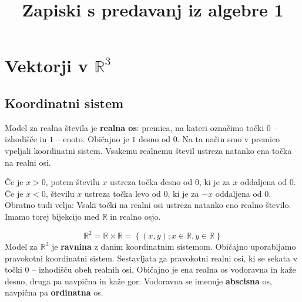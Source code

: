 \documentclass[a4,12pt]{article}
\title{Zapiski s predavanj iz algebre 1}
\newcommand{\R}{\mathbb{R}}
\begin{document}
\maketitle

\tableofcontents

\section{Vektorji v \(\R^3\)}
\subsection{Koordinatni sistem}
    Model za realna števila je \textbf{realna os}: premica, na kateri označimo točki \(0\) -- izhodišče in \(1\) -- enoto.
    Običajno je \(1\) desno od \(0\). Na ta način smo v premico vpeljali koordinatni sistem. Vsakemu realnemu števil
    ustreza natanko ena točka na realni osi.

    Če je \(x > 0\), potem številu \(x\) ustreza točka desno od \(0\), ki je za \(x\) oddaljena od \(0\). Če je 
    \(x < 0\), številu \(x\) ustreza točka levo od \(0\), ki je za \(-x\) oddaljena od \(0\).
    Obratno tudi velja: Vsaki točki na realni osi ustreza natanko eno realno število.
    Imamo torej bijekcijo med \(\R\) in realno osjo.

    \[\R^2 = \R \times \R = \left\{\left(x, y\right); x \in \R, y \in \R\right\}\]
    Model za \(\R^2\) je \textbf{ravnina} z danim koordinatnim sistemom. Običajno uporabljamo pravokotni koordinatni sistem.
    Sestavljata ga pravokotni realni osi, ki se sekata v točki \(0\) -- izhodišču obeh realnih osi. Običajno je ena realna
    os vodoravna in kaže desno, druga pa navpična in kaže gor. Vodoravna se imenuje \textbf{abscisna} os, navpična pa
    \textbf{ordinatna} os.
\end{document}
